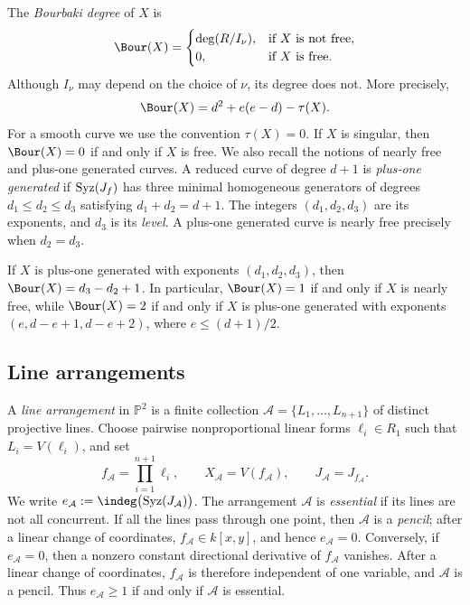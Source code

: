 \documentclass[11pt]{amsart}   %
\theoremstyle{definition}
\def\syz{\mbox{\rm Syz}}
\def\NZQ{\mathbb}               %
\def\PP{{\NZQ P}}
\def\A{{\mathcal A}}
\begin{document}
The \emph{Bourbaki degree} of $X$ is
\[
\Bour(X)=
\begin{cases}
\deg(R/I_\nu),&\text{if $X$ is not free},\\ 0,&\text{if $X$ is free}.
\end{cases}
\]
Although $I_\nu$ may depend on the choice of $\nu$, its degree does not. More precisely,
\begin{equation}
\label{eq:bourbaki-degree-formula}
\Bour(X)=d^2+e(e-d)-\tau(X).
\end{equation}
For a smooth curve we use the convention $\tau(X)=0$. If $X$ is singular, then $\Bour(X)=0$ if and only if $X$ is free. We also recall the notions of nearly free and plus-one generated curves. A reduced curve of degree $d+1$ is \emph{plus-one generated} if $\syz(J_f)$ has three minimal homogeneous generators of degrees $d_1\leq d_2\leq d_3$ satisfying $d_1+d_2=d+1$. The integers $(d_1,d_2,d_3)$ are its exponents, and $d_3$ is its \emph{level}. A plus-one generated curve is nearly free precisely when $d_2=d_3$.

If $X$ is plus-one generated with exponents $(d_1,d_2,d_3)$, then $\Bour(X)=d_3-d_2+1$. In particular, $\Bour(X)=1$ if and only if $X$ is nearly free, while $\Bour(X)=2$ if and only if $X$ is plus-one generated with exponents $(e,d-e+1,d-e+2)$, where $e\leq(d+1)/2$.


\subsection{Line arrangements}
\label{subsec:line-arrangements}

A \emph{line arrangement} in $\PP^2$ is a finite collection $\A=\{L_1,\ldots,L_{n+1}\}$ of distinct projective lines. Choose pairwise nonproportional linear forms $\ell_i\in R_1$ such that $L_i=V(\ell_i)$, and set
\[
f_\A=\prod_{i=1}^{n+1}\ell_i,\qquad X_\A=V(f_\A),\qquad J_\A=J_{f_\A}.
\]
We write $e_\A:=\indeg\bigl(\syz(J_\A)\bigr)$. The arrangement $\A$ is \emph{essential} if its lines are not all concurrent.  If all the lines pass through one point, then $\A$ is a \emph{pencil}; after a linear change of coordinates, $f_\A\in k[x,y]$, and hence $e_\A=0$. Conversely, if $e_\A=0$, then a nonzero constant directional derivative of $f_\A$ vanishes. After a linear change of coordinates, $f_\A$ is therefore independent of one variable, and $\A$ is a pencil. Thus $e_\A\geq1$ if and only if $\A$ is essential.
\end{document}

